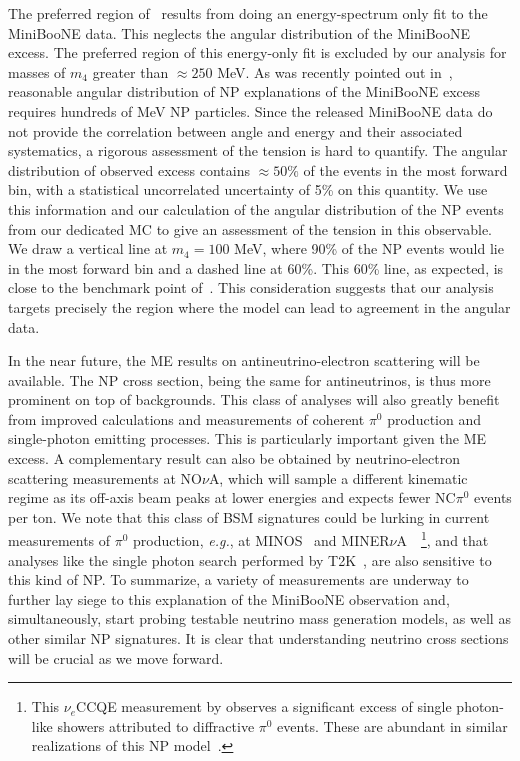 The preferred region of~\cite{Bertuzzo:2018itn} results from doing an energy-spectrum only fit to the MiniBooNE data. This neglects the angular distribution of the MiniBooNE excess. The preferred region of this energy-only fit is excluded by our analysis for masses of $m_4$ greater than $\approx 250$ MeV. As was recently pointed out in~\cite{Jordan:2018qiy}, reasonable angular distribution of NP explanations of the MiniBooNE excess requires hundreds of MeV NP particles.
Since the released MiniBooNE data do not provide the correlation between angle and energy and their associated systematics, a rigorous assessment of the tension is hard to quantify. The angular distribution of observed excess contains $\approx 50\%$ of the events in the most forward bin, with a statistical uncorrelated uncertainty of 5\% on this quantity.
We use this information and our calculation of the angular distribution of the NP events from our dedicated MC to give an assessment of the tension in this observable. We draw a vertical line at $m_4 = 100$ MeV, where 90\% of the NP events would lie in the most forward bin and a dashed line at 60\%. 
This 60\% line, as expected, is close to the benchmark point of~\cite{Bertuzzo:2018itn}. This consideration suggests that our analysis targets precisely the region where the model can lead to agreement in the angular data. 

In the near future, the \minerva ME results on antineutrino-electron scattering will be available. The NP cross section, being the same for antineutrinos, is thus more prominent on top of backgrounds.
This class of analyses will also greatly benefit from improved calculations and measurements of coherent $\pi^0$ production and single-photon emitting processes. This is particularly important given the \minerva ME excess.
A complementary result can also be obtained by neutrino-electron scattering measurements at NO$\nu$A, which will sample a different kinematic regime as its off-axis beam peaks at lower energies and expects fewer NC$\pi^0$ events per ton.
We note that this class of BSM signatures could be lurking in current measurements of $\pi^0$ production, \textit{e.g.}, at MINOS~\cite{Adamson:2016hyz} and MINER$\nu$A~\cite{Wolcott:2016hws}~\footnote{This $\nu_e$CCQE measurement by \minerva observes a significant excess of single photon-like showers attributed to diffractive $\pi^0$ events. These are abundant in similar realizations of this NP model~\cite{Ballett:2018ynz}.}, and that analyses like the single photon search performed by T2K~\cite{Abe:2019cer}, are also sensitive to this kind of NP. To summarize, a variety of measurements are underway to further lay siege to this explanation of the MiniBooNE observation and, simultaneously, start probing testable neutrino mass generation models, as well as other similar NP signatures. It is clear that understanding neutrino cross sections will be crucial as we move forward.
